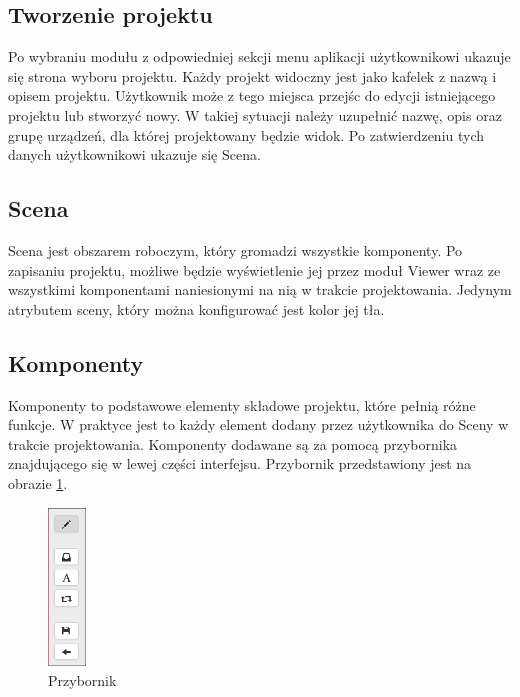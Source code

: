 \subsection{Tworzenie projektu}

Po wybraniu modułu z odpowiedniej sekcji menu aplikacji użytkownikowi ukazuje się strona wyboru projektu. Każdy projekt widoczny jest jako kafelek z nazwą i opisem projektu. Użytkownik może z tego miejsca przejśc do edycji istniejącego projektu lub stworzyć nowy. W takiej sytuacji należy uzupełnić nazwę, opis oraz grupę urządzeń, dla której projektowany będzie widok. Po zatwierdzeniu tych danych użytkownikowi ukazuje się Scena.


\subsection{Scena}
Scena jest obszarem roboczym, który gromadzi wszystkie komponenty. Po zapisaniu projektu, możliwe będzie wyświetlenie jej przez moduł Viewer wraz ze wszystkimi komponentami naniesionymi na nią w trakcie projektowania. Jedynym atrybutem sceny, który można konfigurować jest kolor jej tła.

\subsection{Komponenty}
Komponenty to podstawowe elementy składowe projektu, które pełnią różne funkcje. W praktyce jest to każdy element dodany przez użytkownika do Sceny w trakcie projektowania. Komponenty dodawane są za pomocą przybornika znajdującego się w lewej części interfejsu. Przybornik przedstawiony jest na obrazie \ref{fig:toolbox}. 

\begin{figure}[h]
\centerline{
	\includegraphics[width=10mm]{./img/screen/designer_przybornik.png}
	}
	\caption{Przybornik}
	\label{fig:toolbox}
\end{figure}


